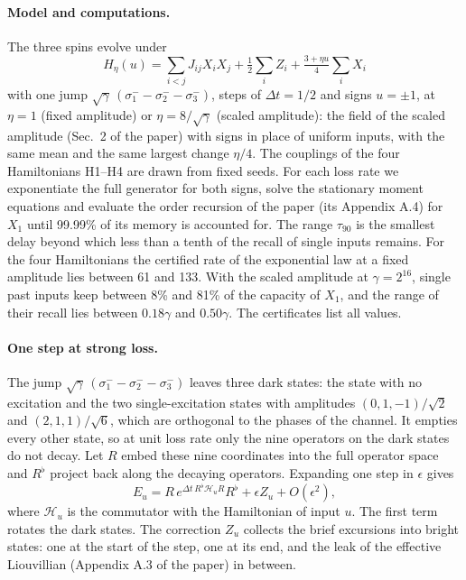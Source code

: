 \documentclass[a4paper,11pt]{article}
\begin{document}
\paragraph{Model and computations.}
The three spins evolve under
\begin{equation}
  H_\eta(u)=\sum_{i<j}J_{ij}X_iX_j+\tfrac12\sum_iZ_i+\tfrac{3+\eta u}{4}\sum_iX_i
  \label{eq:H3}
\end{equation}
with one jump $\sqrt\gamma\,(\sigma_1^--\sigma_2^--\sigma_3^-)$, steps of $\Delta t=1/2$ and signs $u=\pm1$, at
$\eta=1$ (fixed amplitude) or $\eta=8/\sqrt\gamma$ (scaled amplitude): the field of the scaled amplitude
(Sec.~2 of the paper) with signs in place of uniform inputs, with the same mean and the same largest change
$\eta/4$. The couplings of the four Hamiltonians H1--H4
are drawn from fixed seeds. For each loss rate we exponentiate the full generator for both signs, solve the
stationary moment equations and evaluate the order recursion of the paper (its Appendix A.4) for $X_1$ until 99.99\% of its memory is accounted
for. The range $\tau_{90}$ is the smallest delay beyond which less than a tenth of the recall of single inputs
remains. For the four Hamiltonians the certified rate of the exponential law at a fixed amplitude lies between 61
and 133. With the scaled amplitude at $\gamma=2^{16}$, single past inputs keep between 8\% and 81\% of the capacity of $X_1$,
and the range of their recall lies between $0.18\gamma$ and $0.50\gamma$. The certificates list all values.

\paragraph{One step at strong loss.}
The jump $\sqrt\gamma\,(\sigma_1^--\sigma_2^--\sigma_3^-)$ leaves three dark states: the state with no excitation
and the two single-excitation states with amplitudes $(0,1,-1)/\sqrt2$ and $(2,1,1)/\sqrt6$, which are orthogonal to
the phases of the channel. It empties every other state, so at unit loss rate only the nine operators on the dark
states do not decay. Let $R$ embed these nine coordinates into the full operator space and $R^\flat$ project back
along the decaying operators. Expanding one step in $\epsilon$ gives
\begin{equation}
  E_u=R\,e^{\Delta t\,R^\flat\mathcal H_uR}R^\flat+\epsilon Z_u+O(\epsilon^2),
  \label{eq:slowstep}
\end{equation}
where $\mathcal H_u$ is the commutator with the Hamiltonian of input $u$. The first term rotates the dark states. The
correction $Z_u$ collects the brief excursions into bright states: one at the start of the step, one at its end, and
the leak of the effective Liouvillian (Appendix A.3 of the paper) in between.
\end{document}
